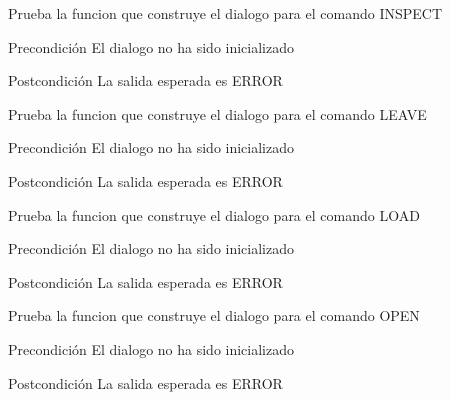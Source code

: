 \begin{DoxyRefList}
\item[\label{test__test000041}%
\hypertarget{test__test000041}{}%
Global \hyperlink{dialogue__test_8c_ac737fa433cecf2ec8e2f65dea6df8d21}{test2\-\_\-dialogue\-\_\-inspect} ()]Prueba la funcion que construye el dialogo para el comando I\-N\-S\-P\-E\-C\-T \begin{DoxyPrecond}{Precondición}
El dialogo no ha sido inicializado 
\end{DoxyPrecond}
\begin{DoxyPostcond}{Postcondición}
La salida esperada es E\-R\-R\-O\-R  
\end{DoxyPostcond}

\item[\label{test__test000033}%
\hypertarget{test__test000033}{}%
Global \hyperlink{dialogue__test_8c_a87a0297476cfdbb7e02af0b01eb63c24}{test2\-\_\-dialogue\-\_\-leave} ()]Prueba la funcion que construye el dialogo para el comando L\-E\-A\-V\-E \begin{DoxyPrecond}{Precondición}
El dialogo no ha sido inicializado 
\end{DoxyPrecond}
\begin{DoxyPostcond}{Postcondición}
La salida esperada es E\-R\-R\-O\-R  
\end{DoxyPostcond}

\item[\label{test__test000037}%
\hypertarget{test__test000037}{}%
Global \hyperlink{dialogue__test_8c_a1fc72cfd6c032b664412a2e7c22bc892}{test2\-\_\-dialogue\-\_\-load} ()]Prueba la funcion que construye el dialogo para el comando L\-O\-A\-D \begin{DoxyPrecond}{Precondición}
El dialogo no ha sido inicializado 
\end{DoxyPrecond}
\begin{DoxyPostcond}{Postcondición}
La salida esperada es E\-R\-R\-O\-R  
\end{DoxyPostcond}

\item[\label{test__test000043}%
\hypertarget{test__test000043}{}%
Global \hyperlink{dialogue__test_8c_a39c1ac853e3d18d6a25041a555212aa3}{test2\-\_\-dialogue\-\_\-open} ()]Prueba la funcion que construye el dialogo para el comando O\-P\-E\-N \begin{DoxyPrecond}{Precondición}
El dialogo no ha sido inicializado 
\end{DoxyPrecond}
\begin{DoxyPostcond}{Postcondición}
La salida esperada es E\-R\-R\-O\-R  
\end{DoxyPostcond}


\end{DoxyRefList}
